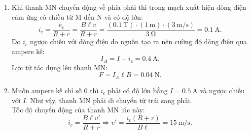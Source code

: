\begin{vd}
{\begin{enumerate}[label=\alph*)]
			Độ lớn lực từ tác dụng lên thanh MN:
			$$F=I\ell B=\left(\SI{0.5}{\ampere}\right)\cdot\left(\SI{1}{\meter}\right)\cdot\left(\SI{0.1}{\tesla}\right)=\SI{0.05}{\newton}.$$
			\item Khi thanh MN chuyển động về phía phải thì trong mạch xuất hiện dòng điện cảm ứng có chiều từ M đến N và có độ lớn:
			$$i_c=\dfrac{e_c}{R+r}=\dfrac{B\ell v}{R+r}=\dfrac{\left(\SI{0.1}{\tesla}\right)\cdot\left(\SI{1}{\meter}\right)\cdot\left(\SI{3}{\meter/\second}\right)}{\SI{3}{\ohm}}=\SI{0.1}{\ampere}.$$
			Do $i_c$ ngược chiều với dòng điện do nguồn tạo ra nên cường độ dòng điện qua ampere kế:
			$$I_A=I-i_c=\SI{0.4}{\ampere}.$$
			Lực từ tác dụng lên thanh MN:
			$$F=I_A\ell B=\SI{0.04}{\newton}.$$
			\item Muốn ampere kế chỉ số 0 thì $i_c$ phải có độ lớn bằng $I=\SI{0.5}{\ampere}$ và ngược chiều với $I$. Như vậy, thanh MN phải di chuyển từ trái sang phải.\\
			Tốc độ chuyển động của thanh MN lúc này:
			$$i_c=\dfrac{B\ell v'}{R+r}\Rightarrow v'=\dfrac{i_c\left(R+r\right)}{B\ell}=\SI{15}{\meter/\second}.$$
	\end{enumerate}	}
\end{vd}

